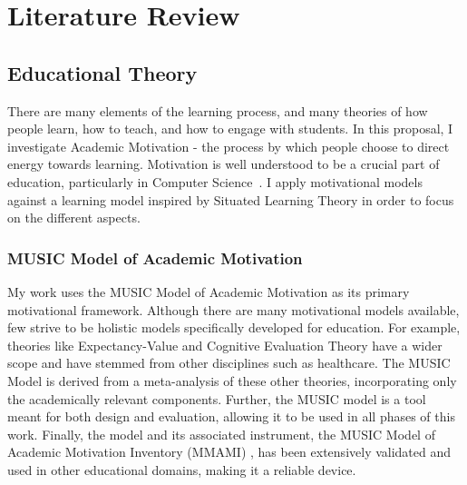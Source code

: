 \section{Literature Review}

\subsection{Educational Theory}

There are many elements of the learning process, and many theories of how people learn, how to teach, and how to engage with students. 
In this proposal, I investigate Academic Motivation - the process by which people choose to direct energy towards learning.
Motivation is well understood to be a crucial part of education, particularly in Computer Science~\cite{Carter:2011}.
I apply motivational models against a learning model inspired by Situated Learning Theory in order to focus on the different aspects.

\subsubsection{MUSIC Model of Academic Motivation}

My work uses the MUSIC Model of Academic Motivation as its primary motivational framework.
Although there are many motivational models available, few strive to be holistic models specifically developed for education.
For example, theories like Expectancy-Value and Cognitive Evaluation Theory have a wider scope and have stemmed from other disciplines such as healthcare. %
The MUSIC Model is derived from a meta-analysis of these other theories, incorporating only the academically relevant components.
Further, the MUSIC model is a tool meant for both design and evaluation, allowing it to be used in all phases of this work.
Finally, the model and its associated instrument, the MUSIC Model of Academic Motivation Inventory (MMAMI) , has been extensively validated and used in other educational domains, making it a reliable device\cite{jones-validity}.

